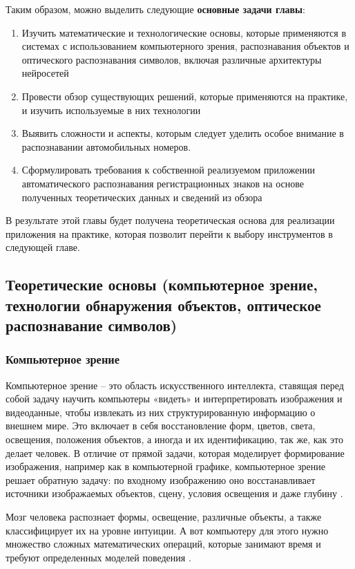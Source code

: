 \documentclass[a4paper,12pt]{article}
\begin{document}
Таким образом, можно выделить следующие \textbf{основные задачи главы}:
\begin{enumerate}
    \item Изучить математические и технологические основы, которые применяются в системах с использованием компьютерного зрения, распознавания объектов и оптического распознавания символов, включая различные архитектуры нейросетей
    \item Провести обзор существующих решений, которые применяются на практике, и изучить используемые в них технологии
    \item Выявить сложности и аспекты, которым следует уделить особое внимание в распознавании автомобильных номеров.
    \item Сформулировать требования к собственной реализуемом приложении автоматического распознавания регистрационных знаков на основе полученных теоретических данных и сведений из обзора
\end{enumerate}

В результате этой главы будет получена теоретическая основа для реализации приложения на практике, которая позволит перейти к выбору инструментов в следующей главе.

\subsection{Теоретические основы (компьютерное зрение, технологии обнаружения объектов, оптическое распознавание символов)}

\subsubsection{Компьютерное зрение}

Компьютерное зрение – это область искусственного интеллекта, ставящая перед собой задачу научить компьютеры «видеть» и интерпретировать изображения и видеоданные, чтобы извлекать из них структурированную информацию о внешнем мире. Это включает в себя восстановление форм, цветов, света, освещения, положения объектов, а иногда и их идентификацию, так же, как это делает человек. 
В отличие от прямой задачи, которая моделирует формирование изображения, например как в компьютерной графике, компьютерное зрение решает обратную задачу: по входному изображению оно восстанавливает источники изображаемых объектов, сцену, условия освещения и даже глубину \cite{szeliski}.

Мозг человека распознает формы, освещение, различные объекты, а также классифицирует их на уровне интуиции. А вот компьютеру для этого нужно множество сложных математических операций, которые занимают время и требуют определенных моделей поведения \cite{szeliski}.
\end{document}
